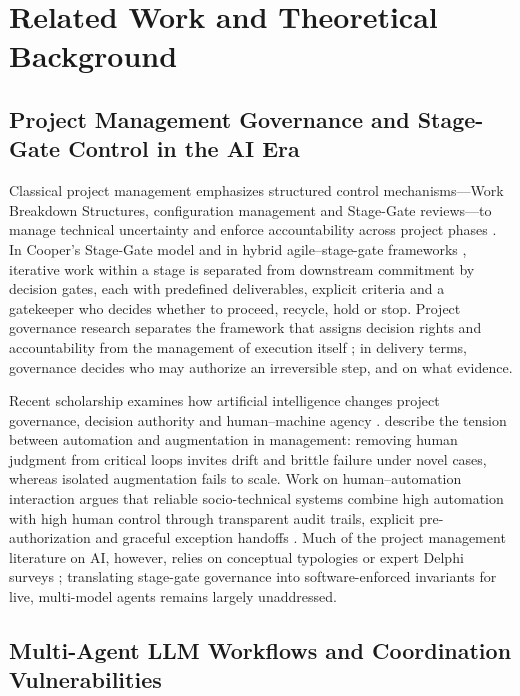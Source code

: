 \documentclass[11pt,a4paper]{article}
\theoremstyle{definition}
\begin{document}
\section{Related Work and Theoretical Background}
\label{sec:2}

\subsection{Project Management Governance and Stage-Gate Control in the AI Era}
\label{sec:2.1}

Classical project management emphasizes structured control mechanisms---Work Breakdown Structures, configuration management and Stage-Gate reviews---to manage technical uncertainty and enforce accountability across project phases \citep{Cooper1990, Whyte2016, PMI2021, Kerzner2022}. In Cooper's Stage-Gate model and in hybrid agile--stage-gate frameworks \citep{Conforto2016, Bianchi2022}, iterative work within a stage is separated from downstream commitment by decision gates, each with predefined deliverables, explicit criteria and a gatekeeper who decides whether to proceed, recycle, hold or stop. Project governance research separates the framework that assigns decision rights and accountability from the management of execution itself \citep{Too2014}; in delivery terms, governance decides who may authorize an irreversible step, and on what evidence.

Recent scholarship examines how artificial intelligence changes project governance, decision authority and human--machine agency \citep{Holzmann2022, Muller2024}. \citet{Raisch2021} describe the tension between automation and augmentation in management: removing human judgment from critical loops invites drift and brittle failure under novel cases, whereas isolated augmentation fails to scale. Work on human--automation interaction argues that reliable socio-technical systems combine high automation with high human control through transparent audit trails, explicit pre-authorization and graceful exception handoffs \citep{Parasuraman2000, Amershi2019, Shneiderman2020}. Much of the project management literature on AI, however, relies on conceptual typologies or expert Delphi surveys \citep{Holzmann2022}; translating stage-gate governance into software-enforced invariants for live, multi-model agents remains largely unaddressed.

\subsection{Multi-Agent LLM Workflows and Coordination Vulnerabilities}
\label{sec:2.2}
\end{document}
